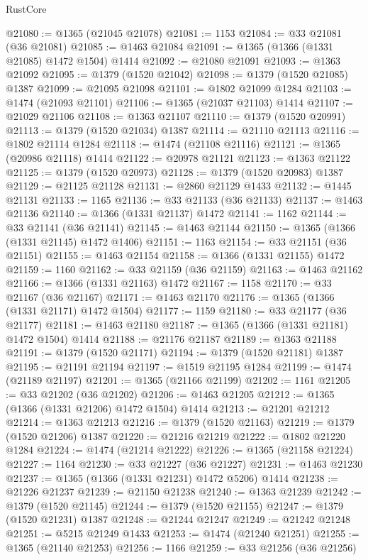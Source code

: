 \begin{lexlean}{RustCore}
\begin{coremodule}
@21080 := @1365 (@21045 @21078)
@21081 := 1153
@21084 := @33 @21081 (@36 @21081)
@21085 := @1463 @21084
@21091 := @1365 (@1366 (@1331 @21085) @1472 @1504) @1414
@21092 := @21080 @21091
@21093 := @1363 @21092
@21095 := @1379 (@1520 @21042)
@21098 := @1379 (@1520 @21085) @1387
@21099 := @21095 @21098
@21101 := @1802 @21099 @1284
@21103 := @1474 (@21093 @21101)
@21106 := @1365 (@21037 @21103) @1414
@21107 := @21029 @21106
@21108 := @1363 @21107
@21110 := @1379 (@1520 @20991)
@21113 := @1379 (@1520 @21034) @1387
@21114 := @21110 @21113
@21116 := @1802 @21114 @1284
@21118 := @1474 (@21108 @21116)
@21121 := @1365 (@20986 @21118) @1414
@21122 := @20978 @21121
@21123 := @1363 @21122
@21125 := @1379 (@1520 @20973)
@21128 := @1379 (@1520 @20983) @1387
@21129 := @21125 @21128
@21131 := @2860 @21129 @1433
@21132 := @1445 @21131
@21133 := 1165
@21136 := @33 @21133 (@36 @21133)
@21137 := @1463 @21136
@21140 := @1366 (@1331 @21137) @1472
@21141 := 1162
@21144 := @33 @21141 (@36 @21141)
@21145 := @1463 @21144
@21150 := @1365 (@1366 (@1331 @21145) @1472 @1406)
@21151 := 1163
@21154 := @33 @21151 (@36 @21151)
@21155 := @1463 @21154
@21158 := @1366 (@1331 @21155) @1472
@21159 := 1160
@21162 := @33 @21159 (@36 @21159)
@21163 := @1463 @21162
@21166 := @1366 (@1331 @21163) @1472
@21167 := 1158
@21170 := @33 @21167 (@36 @21167)
@21171 := @1463 @21170
@21176 := @1365 (@1366 (@1331 @21171) @1472 @1504)
@21177 := 1159
@21180 := @33 @21177 (@36 @21177)
@21181 := @1463 @21180
@21187 := @1365 (@1366 (@1331 @21181) @1472 @1504) @1414
@21188 := @21176 @21187
@21189 := @1363 @21188
@21191 := @1379 (@1520 @21171)
@21194 := @1379 (@1520 @21181) @1387
@21195 := @21191 @21194
@21197 := @1519 @21195 @1284
@21199 := @1474 (@21189 @21197)
@21201 := @1365 (@21166 @21199)
@21202 := 1161
@21205 := @33 @21202 (@36 @21202)
@21206 := @1463 @21205
@21212 := @1365 (@1366 (@1331 @21206) @1472 @1504) @1414
@21213 := @21201 @21212
@21214 := @1363 @21213
@21216 := @1379 (@1520 @21163)
@21219 := @1379 (@1520 @21206) @1387
@21220 := @21216 @21219
@21222 := @1802 @21220 @1284
@21224 := @1474 (@21214 @21222)
@21226 := @1365 (@21158 @21224)
@21227 := 1164
@21230 := @33 @21227 (@36 @21227)
@21231 := @1463 @21230
@21237 := @1365 (@1366 (@1331 @21231) @1472 @5206) @1414
@21238 := @21226 @21237
@21239 := @21150 @21238
@21240 := @1363 @21239
@21242 := @1379 (@1520 @21145)
@21244 := @1379 (@1520 @21155)
@21247 := @1379 (@1520 @21231) @1387
@21248 := @21244 @21247
@21249 := @21242 @21248
@21251 := @5215 @21249 @1433
@21253 := @1474 (@21240 @21251)
@21255 := @1365 (@21140 @21253)
@21256 := 1166
@21259 := @33 @21256 (@36 @21256)

\end{coremodule}
\end{lexlean}

